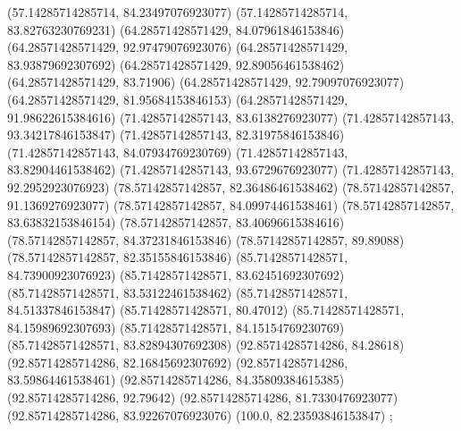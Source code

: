 {{{		(57.14285714285714, 84.23497076923077)
		(57.14285714285714, 83.82763230769231)
		(64.28571428571429, 84.07961846153846)
		(64.28571428571429, 92.97479076923076)
		(64.28571428571429, 83.93879692307692)
		(64.28571428571429, 92.89056461538462)
		(64.28571428571429, 83.71906)
		(64.28571428571429, 92.79097076923077)
		(64.28571428571429, 81.95684153846153)
		(64.28571428571429, 91.98622615384616)
		(71.42857142857143, 83.6138276923077)
		(71.42857142857143, 93.34217846153847)
		(71.42857142857143, 82.31975846153846)
		(71.42857142857143, 84.07934769230769)
		(71.42857142857143, 83.82904461538462)
		(71.42857142857143, 93.6729676923077)
		(71.42857142857143, 92.2952923076923)
		(78.57142857142857, 82.36486461538462)
		(78.57142857142857, 91.1369276923077)
		(78.57142857142857, 84.09974461538461)
		(78.57142857142857, 83.63832153846154)
		(78.57142857142857, 83.40696615384616)
		(78.57142857142857, 84.37231846153846)
		(78.57142857142857, 89.89088)
		(78.57142857142857, 82.35155846153846)
		(85.71428571428571, 84.73900923076923)
		(85.71428571428571, 83.62451692307692)
		(85.71428571428571, 83.53122461538462)
		(85.71428571428571, 84.51337846153847)
		(85.71428571428571, 80.47012)
		(85.71428571428571, 84.15989692307693)
		(85.71428571428571, 84.15154769230769)
		(85.71428571428571, 83.82894307692308)
		(92.85714285714286, 84.28618)
		(92.85714285714286, 82.16845692307692)
		(92.85714285714286, 83.59864461538461)
		(92.85714285714286, 84.35809384615385)
		(92.85714285714286, 92.79642)
		(92.85714285714286, 81.7330476923077)
		(92.85714285714286, 83.92267076923076)
		(100.0, 82.23593846153847)
	};

}}
